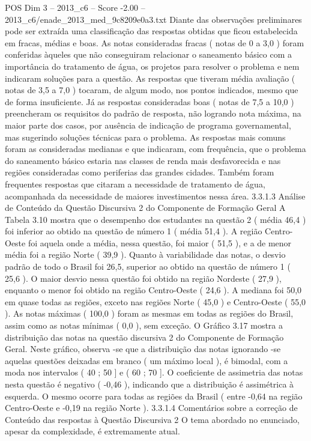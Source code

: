 \begin{textsample}{POS Dim 3 – 2013\_c6 – Score -2.00 – 2013\_c6/enade\_2013\_med\_9c8209e0a3.txt}
Diante das observações preliminares pode ser extraída uma classificação das respostas obtidas que ficou estabelecida em fracas, médias e boas.
As notas consideradas fracas ( notas de 0 a 3,0 ) foram conferidas àqueles que não conseguiram relacionar o saneamento básico com a importância do tratamento de água, os projetos para resolver o problema e nem indicaram soluções para a questão.
As respostas que tiveram média avaliação ( notas de 3,5 a 7,0 ) tocaram, de algum modo, nos pontos indicados, mesmo que de forma insuficiente.
Já as respostas consideradas boas ( notas de 7,5 a 10,0 ) preencheram os requisitos do padrão de resposta, não logrando nota máxima, na maior parte dos casos, por ausência de indicação de programa governamental, mas sugerindo soluções técnicas para o problema.
As respostas mais comuns foram as consideradas medianas e que indicaram, com frequência, que o problema do saneamento básico estaria nas classes de renda mais desfavorecida e nas regiões consideradas como periferias das grandes cidades.
Também foram frequentes respostas que citaram a necessidade de tratamento de água, acompanhada da necessidade de maiores investimentos nessa área. 3.3.1.3 Análise de Conteúdo da Questão Discursiva 2 do Componente de Formação Geral A Tabela 3.10 mostra que o desempenho dos estudantes na questão 2 ( média 46,4 ) foi inferior ao obtido na questão de número 1 ( média 51,4 ).
A região Centro-Oeste foi aquela onde a média, nessa questão, foi maior ( 51,5 ), e a de menor média foi a região Norte ( 39,9 ).
Quanto à variabilidade das notas, o desvio padrão de todo o Brasil foi 26,5, superior ao obtido na questão de número 1 ( 25,6 ).
O maior desvio nessa questão foi obtido na região Nordeste ( 27,9 ), enquanto o menor foi obtido na região Centro-Oeste ( 24,6 ).
A mediana foi 50,0 em quase todas as regiões, exceto nas regiões Norte ( 45,0 ) e Centro-Oeste ( 55,0 ).
As notas máximas ( 100,0 ) foram as mesmas em todas as regiões do Brasil, assim como as notas mínimas ( 0,0 ), sem exceção.
O Gráfico 3.17 mostra a distribuição das notas na questão discursiva 2 do Componente de Formação Geral.
Neste gráfico, observa -se que a distribuição das notas ignorando -se aquelas questões deixadas em branco ( um máximo local ), é bimodal, com a moda nos intervalos ( 40 ; 50 ] e ( 60 ; 70 ].
O coeficiente de assimetria das notas nesta questão é negativo ( -0,46 ), indicando que a distribuição é assimétrica à esquerda.
O mesmo ocorre para todas as regiões da Brasil ( entre -0,64 na região Centro-Oeste e -0,19 na região Norte ). 3.3.1.4 Comentários sobre a correção de Conteúdo das respostas à Questão Discursiva 2 O tema abordado no enunciado, apesar da complexidade, é extremamente atual.

\end{textsample}
